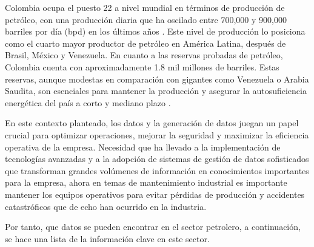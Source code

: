 \documentclass[
  11pt,
  bookmarksnumbered]{article}
\begin{document}
Colombia ocupa el puesto 22 a nivel mundial en términos de producción de petróleo, con una producción diaria que ha oscilado entre 700,000 y 900,000 barriles por día (bpd) en los últimos años \textcite{bp2023statistical}.
Este nivel de producción lo posiciona como el cuarto mayor productor de petróleo en América Latina, después de Brasil, México y Venezuela.
En cuanto a las reservas probadas de petróleo, Colombia cuenta con aproximadamente 1.8 mil millones de barriles.
Estas reservas, aunque modestas en comparación con gigantes como Venezuela o Arabia Saudita, son esenciales para mantener la producción y asegurar la autosuficiencia energética del país a corto y mediano plazo \textcite{bp2023statistical}.

En este contexto planteado, los datos y la generación de datos juegan un papel crucial para optimizar operaciones, mejorar la seguridad y maximizar la eficiencia operativa de la empresa.
Necesidad que ha llevado a la implementación de tecnologías avanzadas y a la adopción de sistemas de gestión de datos sofisticados que transforman grandes volúmenes de información en conocimientos importantes para la empresa, ahora en temas de mantenimiento industrial es importante mantener los equipos operativos para evitar pérdidas de producción y accidentes catastróficos que de echo han ocurrido en la industria.

Por tanto, que datos se pueden encontrar en el sector petrolero, a continuación, se hace una lista de la información clave en este sector.
\end{document}
